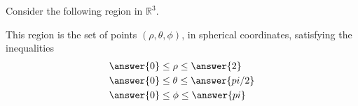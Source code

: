 \documentclass{ximera}
\begin{document}
\begin{problem}
Consider the following region in $\mathbb{R}^3$.

\begin{image}
\end{image}

This region is the set of points $(\rho,\theta,\phi)$, in spherical coordinates, satisfying the inequalities
\begin{align*}
&\answer{0}\leq\rho\leq \answer{2}\\
&\answer{0}\leq\theta\leq\answer{pi/2}\\
&\answer{0}\leq\phi\leq\answer{pi}
\end{align*}

\end{problem}
\end{document}
